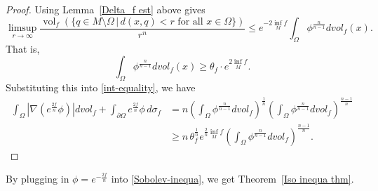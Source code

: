 \documentclass[psamsfonts]{amsart}
\theoremstyle{definition}
\theoremstyle{remark}
\numberwithin{equation}{section}
\begin{document}
\begin{proof}
Using Lemma~\ref{Delta_f est} above gives 
$$\limsup_{r\to \infty}\frac{\operatorname{vol}_f(\{q \in M \setminus \Omega\, |\, d(x,q) <r \text{ for all } x \in \Omega \})}{r^n} \leq  e^{-2\inf_M f}\int_\Omega \phi^{\frac{n}{n-1}}dvol_f(x).$$
 That is,
$$\int_\Omega \phi^{\frac{n}{n-1}}d vol_f (x) \geq \theta_f \cdot e^{2 \inf_Mf}.$$
Substituting this into \eqref{int-equality}, we have
\begin{align*}
    \int_\Omega \left|\nabla \left(e^{\frac{2f}{n}}\phi\right)\right|dvol_f +  \int_{\partial \Omega} e^{\frac{2f}{n}}\phi \,d\sigma_{f}
    & = n \left(\int_\Omega \phi^{\frac{n}{n-1}} dvol_f\right)^\frac{1}{n} \left(\int_\Omega \phi^{\frac{n}{n-1}} dvol_f \right)^{\frac{n-1}{n}}\\
    & \geq n \,\theta_f^\frac{1}{n} e^{\frac{2}{n}\inf_Mf}\left(\int_\Omega \phi^{\frac{n}{n-1}} dvol_f \right)^{\frac{n-1}{n}}.
\end{align*}

\end{proof}

By plugging in $\phi = e^{-\frac{2f}{n}}$ into \eqref{Sobolev-inequa}, we get Theorem~\ref{Iso inequa thm}. 




\end{document}

